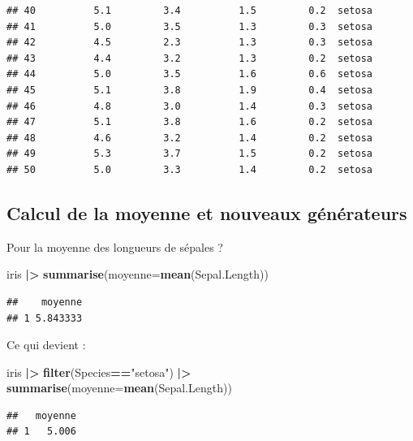 \documentclass[
]{book}
\newenvironment{Shaded}{\begin{snugshade}}{\end{snugshade}}
\newcommand{\AttributeTok}[1]{\textcolor[rgb]{0.13,0.29,0.53}{#1}}
\newcommand{\FunctionTok}[1]{\textcolor[rgb]{0.13,0.29,0.53}{\textbf{#1}}}
\newcommand{\NormalTok}[1]{#1}
\newcommand{\SpecialCharTok}[1]{\textcolor[rgb]{0.81,0.36,0.00}{\textbf{#1}}}
\newcommand{\StringTok}[1]{\textcolor[rgb]{0.31,0.60,0.02}{#1}}
\begin{document}
\begin{verbatim}
## 40          5.1         3.4          1.5         0.2  setosa
## 41          5.0         3.5          1.3         0.3  setosa
## 42          4.5         2.3          1.3         0.3  setosa
## 43          4.4         3.2          1.3         0.2  setosa
## 44          5.0         3.5          1.6         0.6  setosa
## 45          5.1         3.8          1.9         0.4  setosa
## 46          4.8         3.0          1.4         0.3  setosa
## 47          5.1         3.8          1.6         0.2  setosa
## 48          4.6         3.2          1.4         0.2  setosa
## 49          5.3         3.7          1.5         0.2  setosa
## 50          5.0         3.3          1.4         0.2  setosa
\end{verbatim}

\hypertarget{calcul-de-la-moyenne-et-nouveaux-guxe9nuxe9rateurs}{%
\subsection{Calcul de la moyenne et nouveaux générateurs}\label{calcul-de-la-moyenne-et-nouveaux-guxe9nuxe9rateurs}}

Pour la moyenne des longueurs de sépales ?

\begin{Shaded}
\begin{Highlighting}[]
\NormalTok{iris }\SpecialCharTok{|\textgreater{}} \FunctionTok{summarise}\NormalTok{(}\AttributeTok{moyenne=}\FunctionTok{mean}\NormalTok{(Sepal.Length))  }
\end{Highlighting}
\end{Shaded}

\begin{verbatim}
##    moyenne
## 1 5.843333
\end{verbatim}

Ce qui devient :

\begin{Shaded}
\begin{Highlighting}[]
\NormalTok{iris }\SpecialCharTok{|\textgreater{}} \FunctionTok{filter}\NormalTok{(Species}\SpecialCharTok{==}\StringTok{"setosa"}\NormalTok{) }\SpecialCharTok{|\textgreater{}} \FunctionTok{summarise}\NormalTok{(}\AttributeTok{moyenne=}\FunctionTok{mean}\NormalTok{(Sepal.Length))}
\end{Highlighting}
\end{Shaded}

\begin{verbatim}
##   moyenne
## 1   5.006
\end{verbatim}
\end{document}
